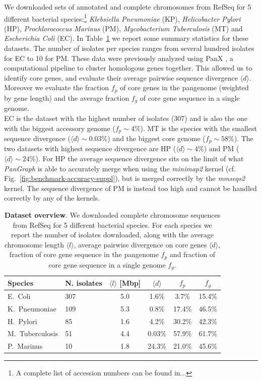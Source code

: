 \documentclass[aps,rmp,reprint,superscriptaddress,notitlepage,10pt,onecolumn]{revtex4-1}
\newcommand{\avg}[1]{\langle #1 \rangle}
\begin{document}
We downloaded sets of annotated and complete chromosomes from RefSeq \cite{o2016reference} for 5 different bacterial species:\footnote{A complete list of accession numbers can be found in...} \textit{Klebsiella Pneumoniae} (KP), \textit{Helicobacter Pylori} (HP), \textit{Prochlorococcus Marinus} (PM), \textit{Mycobacterium Tuberculosis} (MT) and \textit{Escherichia Coli} (EC). In Table~\ref{table:panx-dataset} we report some summary statistics for these datasets. The number of isolates per species ranges from several hundred isolates for EC to 10 for PM.
These data were previously analyzed using PanX \cite{ding2018panx}, a computational pipeline to cluster homologous genes together. This allowed us to identify core genes, and evaluate their average pairwise sequence divergence $\avg{d}$. Moreover we evaluate the fraction $f_p$ of core genes in the pangenome (weighted by gene length) and the average fraction $f_g$ of core gene sequence in a single genome.\\
EC is the dataset with the highest number of isolates (307) and is also the one with the biggest accessory genome ($f_p \sim 4\%$). MT is the species with the smallest sequence divergence ($\avg{d} \sim 0.03\%$) and the biggest core genome ($f_p \sim 58\%$). The two datasets with highest sequence divergence are HP ($\avg{d} \sim 4\%$) and PM ($\avg{d} \sim 24\%$). For HP the average sequence divergence sits on the limit of what \textit{PanGraph} is able to accurately merge when using the \textit{minimap2} kernel (cf. Fig.~\ref{fig:benchmark-accuracy-suppl}), but is merged correctly by the \textit{mmseqs2} kernel. The sequence divergence of PM is instead too high and cannot be handled correctly by any of the kernels.

\begin{table}[hb]
    \setlength{\tabcolsep}{9pt}
    \begin{tabular}{l l c c c c}
        \hline\hline
        Species         & N. isolates & $\avg{l}$ [Mbp] & $\avg{d}$ & $f_p$  & $f_g$  \\
        \hline
        E.~Coli         & 307         & 5.0             & 1.6\%     & 3.7\%  & 15.4\% \\
        K.~Pneumoniae   & 109         & 5.3             & 0.8\%     & 17.4\% & 46.5\% \\
        H.~Pylori       & 85          & 1.6             & 4.2\%     & 30.2\% & 42.3\% \\
        M.~Tuberculosis & 51          & 4.4             & 0.03\%    & 57.9\% & 61.7\% \\
        P.~Marinus      & 10          & 1.8             & 24.3\%    & 21.0\% & 45.6\% \\
        \hline
    \end{tabular}
    \caption{{\bf Dataset overview}. We downloaded complete chromosome sequences from RefSeq for 5 different bacterial species. For each species we report the number of isolates downloaded, along with the average chromosome length $\avg{l}$, average pairwise divergence on core genes $\avg{d}$, fraction of core gene sequence in the pangenome $f_p$ and fraction of core gene sequence in a single genome $f_g$.}
    \label{table:panx-dataset}
\end{table}
\end{document}
